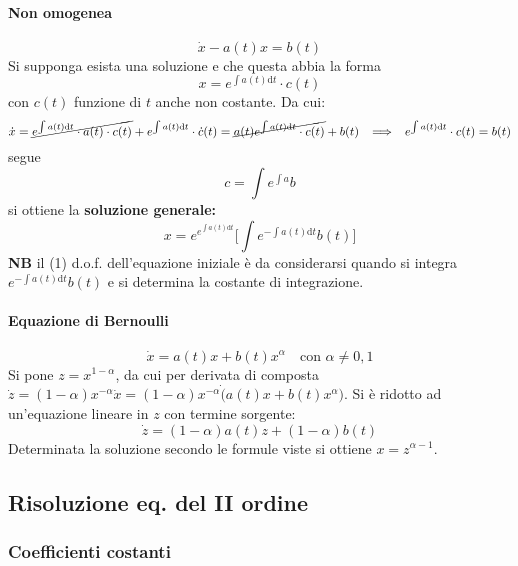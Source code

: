 \documentclass[10pt]{article}
\theoremstyle{plain}
\begin{document}
\paragraph{Non omogenea}
\[\dot x - a(t) x = b(t)\]
Si supponga esista una soluzione e che questa abbia la forma
\[x = e^{\int a(t) \textrm{d}t} \cdot c(t)\]
con $c(t)$ funzione di $t$ anche non costante. Da cui:
\[\dot x = \cancel{e^{\int a(t) \textrm{d}t} \cdot a(t) \cdot c(t)} + e^{\int a(t) \textrm{d}t} \cdot \dot c (t) = \cancel{a(t) e^{\int a(t) \textrm{d}t} \cdot c(t)} + b(t) \enspace \implies \enspace e^{\int a(t) \textrm{d}t} \cdot c(t) = b(t)\]
segue
\[c = \int e^{\int a} b\]
si ottiene la \textbf{soluzione generale:}
\[\boxed{x = e^{e^{\int a(t) \textrm{d}t}} \big[\int e^{- \int a(t) \textrm{d}t} b(t)\big]}\]
\textbf{NB} il (1) d.o.f. dell'equazione iniziale è da considerarsi quando si integra $e^{- \int a(t) \textrm{d}t} b(t)$ e si determina la costante di integrazione.

\paragraph{Equazione di Bernoulli}
\[\dot x = a(t) x + b(t) x^\alpha \quad \textrm{con } \alpha \neq 0,1\]
Si pone $\displaystyle z = x^{1-\alpha}$, da cui per derivata di composta $\displaystyle \dot z = (1-\alpha) x^{-\alpha}\dot x = (1-\alpha) x^{-\alpha}\dot (a(t) x + b(t) x^\alpha)$. Si è ridotto ad un'equazione lineare in $z$ con termine sorgente:
\[\dot z = (1-\alpha)a(t) z + (1-\alpha) b(t)\]
Determinata la soluzione secondo le formule viste si ottiene $x = z^{\alpha - 1}$.

\subsection{Risoluzione eq. del II ordine}
\subsubsection{Coefficienti costanti}
\end{document}
